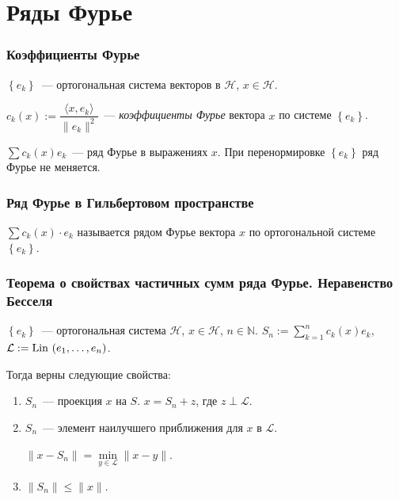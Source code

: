 \documentclass{article}
\begin{document}
\newpage

\part{Ряды Фурье}

\newpage

    \section{Коэффициенты Фурье}
    
        $\left\{ e_k \right\}$~--- ортогональная система векторов в $\mathcal{H}$, $x \in \mathcal{H}$.
        
        $c_k(x) := \dfrac{\langle x, e_k \rangle}{\| e_k \|^2}$~--- \textit{коэффициенты Фурье} вектора $x$ по системе $\left\{ e_k \right\}$.
        
        $\sum c_k(x) e_k$~--- ряд Фурье в выражениях $x$. При перенормировке $\left\{ e_k \right\}$ ряд Фурье не меняется.
            
    \newpage
    
    \section{Ряд Фурье в Гильбертовом пространстве}
    
        $\sum c_k(x) \cdot e_k$ называется рядом Фурье вектора $x$ по ортогональной системе $\left\{ e_k \right\}$.
        
    \newpage
    
    \section{Теорема о свойствах частичных сумм ряда Фурье. Неравенство Бесселя}
    
        $\left\{ e_k \right\}$~--- ортогональная система $\mathcal{H}$, $x \in \mathcal{H}$, $n \in \mathbb{N}$. $S_n := \sum\limits_{k = 1}^n c_k(x) e_k$, $\mathcal{L} := \Lin(e_1, \ldots, e_n)$.
        
        Тогда верны следующие свойства:
        
        \begin{enumerate}
        
            \item $S_n$~--- проекция $x$ на $S$. $x = S_n + z$, где $z \perp \mathcal{L}$.
            
            \item $S_n$~--- элемент наилучшего приближения для $x$ в $\mathcal{L}$.
            
                $\| x - S_n \| = \min\limits_{y \in \mathcal{L}} \| x - y \|$.
            
            \item $\| S_n \| \leqslant \| x \|$.
            
        \end{enumerate}
        
\end{document}
